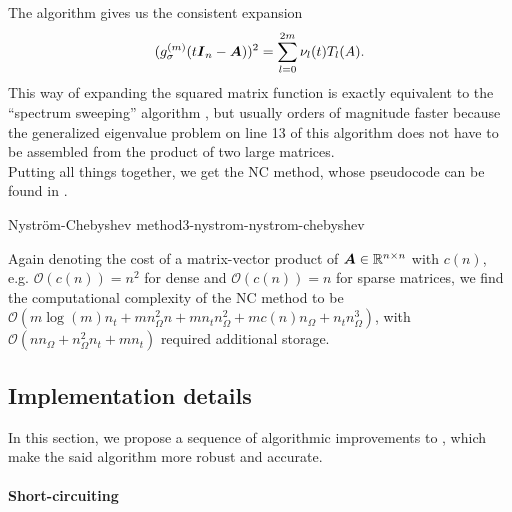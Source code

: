 The algorithm gives us the consistent expansion
\begin{equation}
    (g_{\sigma}^{(m)}(t\boldsymbol{I}_n - \boldsymbol{A}))^2 = \sum_{l=0}^{2m} \nu_l(t) T_l(A).
    \label{equ:3-nystrom-consistent-chebyshev-expansion}
\end{equation}
This way of expanding the squared matrix function
is exactly equivalent to the \enquote{spectrum sweeping}
algorithm \cite[algorithm~5]{lin2017randomized}, but
usually orders of magnitude faster because the generalized eigenvalue problem
on line 13 of this algorithm does not have to be assembled from the
product of two large matrices.\\


Putting all things together, we get the \gls{NC} method, whose pseudocode
can be found in .
\begin{algo}{Nystr\"om-Chebyshev method}{3-nystrom-nystrom-chebyshev}
    
\end{algo}

Again denoting the cost of a matrix-vector product of $\boldsymbol{A} \in \mathbb{R}^{n \times n}$
with $c(n)$, e.g. $\mathcal{O}(c(n)) = n^2$ for dense and $\mathcal{O}(c(n)) = n$
for sparse matrices, we find the computational complexity of the \gls{NC}
method to be $\mathcal{O}(m \log(m) n_t + m n_{\Omega}^2 n + m n_t n_{\Omega}^2 +  m c(n) n_{\Omega} + n_t n_{\Omega}^3)$, with
$\mathcal{O}(n n_{\Omega} + n_{\Omega}^2 n_t + m n_t)$ required additional storage.


\subsection{Implementation details}
\label{subsec:3-nystrom-implementation-details}

In this section, we propose a sequence of algorithmic improvements to
, which make the said algorithm more
robust and accurate.

\paragraph{Short-circuiting}

